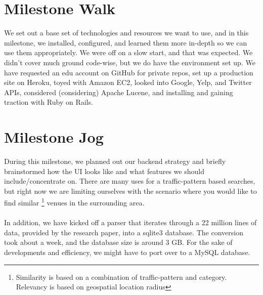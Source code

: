 \documentclass{article}
\begin{document}
%


%
\section{Milestone Walk}
We set out a base set of technologies and resources we want to use, and in this milestone, we installed,
configured, and learned them more in-depth so we can use them appropriately. We were off on a slow start,
and that was expected. We didn't cover much ground code-wise, but we do have the environment set up. We have
requested an edu account on GitHub for private repos, set up a production site on Heroku, toyed with 
Amazon EC2, looked into Google, Yelp, and Twitter APIs, considered (considering) Apache Lucene,
and installing and gaining traction with Ruby on Rails. 

\section{Milestone Jog}
During this milestone, we planned out our backend strategy and briefly brainstormed how the UI looks like and 
what features we should include/concentrate on. There are many uses for a traffic-pattern based searches, but 
right now we are limiting ourselves with the scenario where you would like to find similar
\footnote{Similarity is based on a combination of traffic-pattern and category. Relevancy is based on  
geospatial location radius} venues in the surrounding area. \\ \\
In addition, we have kicked off a parser that iterates through a 22 million lines of data, provided
by the research paper, into a sqlite3 database. The conversion took about a week, and the database
size is around 3 GB. For the sake of developments and efficiency, we might have to port over to a MySQL
database.
\end{document}
